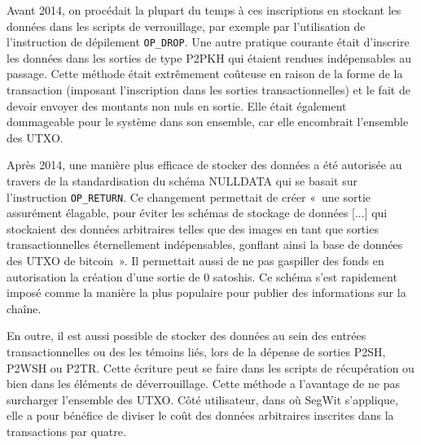 Avant 2014, on procédait la plupart du temps à ces inscriptions en stockant les données dans les scripts de verrouillage, par exemple par l'utilisation de l'instruction de dépilement \texttt{OP\_DROP}. Une autre pratique courante était d'inscrire les données dans les sorties de type P2PKH qui étaient rendues indépensables au passage. Cette méthode était extrêmement coûteuse en raison de la forme de la transaction (imposant l'inscription dans les sorties transactionnelles) et le fait de devoir envoyer des montants non nuls en sortie. Elle était également dommageable pour le système dans son ensemble, car elle encombrait l'ensemble des UTXO.

Après 2014, une manière plus efficace de stocker des données a été autorisée au travers de la standardisation du schéma NULLDATA qui se basait sur l'instruction \texttt{OP\_RETURN}. Ce changement permettait de créer «~une sortie assurément élagable, pour éviter les schémas de stockage de données [...] qui stockaient des données arbitraires telles que des images en tant que sorties transactionnelles éternellement indépensables, gonflant ainsi la base de données des UTXO de bitcoin~». Il permettait aussi de ne pas gaspiller des fonds en autorisation la création d'une sortie de 0 satoshis. Ce schéma s'est rapidement imposé comme la manière la plus populaire pour publier des informations sur la chaîne. %

En outre, il est aussi possible de stocker des données au sein des entrées transactionnelles ou des les témoins liés, lors de la dépense de sorties P2SH, P2WSH ou P2TR. Cette écriture peut se faire dans les scripts de récupération ou bien dans les éléments de déverrouillage. Cette méthode a l'avantage de ne pas surcharger l'ensemble des UTXO. Côté utilisateur, dans où SegWit s'applique, elle a pour bénéfice de diviser le coût des données arbitraires inscrites dans la transactions par quatre.

